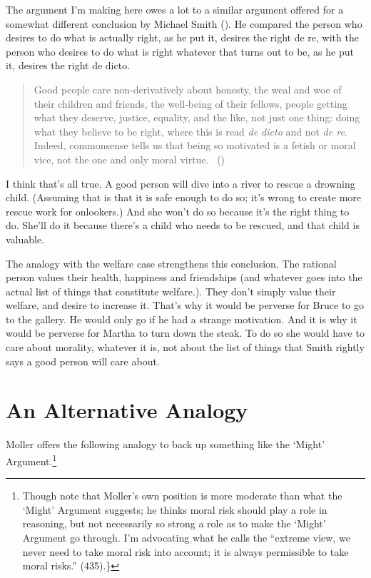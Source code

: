 \documentclass[
  11pt,
  letterpaper,
  DIV=11,
  numbers=noendperiod,
  twoside]{scrartcl}
\begin{document}
The argument I'm making here owes a lot to a similar argument offered
for a somewhat different conclusion by Michael Smith
(). He compared the person who desires to
do what is actually right, as he put it, desires the right de re, with
the person who desires to do what is right whatever that turns out to
be, as he put it, desires the right de dicto.

\begin{quote}
Good people care non-derivatively about honesty, the weal and woe of
their children and friends, the well-being of their fellows, people
getting what they deserve, justice, equality, and the like, not just one
thing: doing what they believe to be right, where this is read \emph{de
dicto} and not \emph{de re}. Indeed, commonsense tells us that being so
motivated is a fetish or moral vice, not the one and only moral virtue.
~()
\end{quote}

I think that's all true. A good person will dive into a river to rescue
a drowning child. (Assuming that is that it is safe enough to do so;
it's wrong to create more rescue work for onlookers.) And she won't do
so because it's the right thing to do. She'll do it because there's a
child who needs to be rescued, and that child is valuable.

The analogy with the welfare case strengthens this conclusion. The
rational person values their health, happiness and friendships (and
whatever goes into the actual list of things that constitute welfare.).
They don't simply value their welfare, and desire to increase it. That's
why it would be perverse for Bruce to go to the gallery. He would only
go if he had a strange motivation. And it is why it would be perverse
for Martha to turn down the steak. To do so she would have to care about
morality, whatever it is, not about the list of things that Smith
rightly says a good person will care about.

\section{An Alternative Analogy}\label{analternativeanalogy}

Moller offers the following analogy to back up something like the
`Might' Argument.\footnote{Though note that Moller's own position is
  more moderate than what the `Might' Argument suggests; he thinks moral
  risk should play a role in reasoning, but not necessarily so strong a
  role as to make the `Might' Argument go through. I'm advocating what
  he calls the ``extreme view, we never need to take moral risk into
  account; it is always permissible to take moral risks.'' (435).\}}
\end{document}
